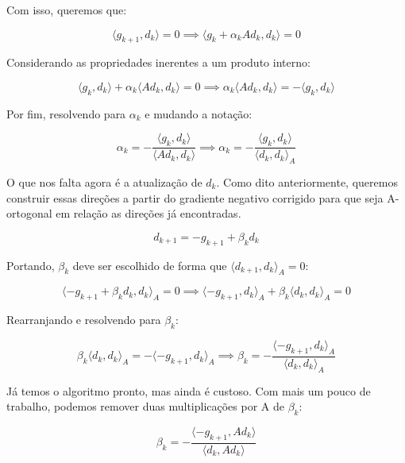 Com isso, queremos que:

\begin{equation}
\label{def_gc_dk_gk1}
\langle g_{k+1}, d_k \rangle = 0 \implies \langle g_k + \alpha_k A d_k, d_k \rangle = 0
\end{equation}


Considerando as propriedades inerentes a um produto interno:

\begin{equation}
\langle g_k, d_k \rangle + \alpha_k \langle A d_k, d_k \rangle = 0 \implies \alpha_k \langle A d_k, d_k \rangle = - \langle g_k, d_k \rangle
\end{equation}

Por fim, resolvendo para \(\alpha_k\) e mudando a notação:

\begin{equation}
\alpha_k= - \frac{\langle g_k, d_k \rangle}{\langle A d_k, d_k \rangle} \implies \alpha_k= - \frac{\langle g_k, d_k \rangle}{\langle d_k, d_k \rangle_A}
\end{equation}


O que nos falta agora é a atualização de \(d_k\). Como dito anteriormente, queremos
construir essas direções a partir do gradiente negativo corrigido para que seja
A-ortogonal em relação as direções já encontradas.

\begin{equation}
\label{def_dk1}
d_{k+1} = -g_{k+1} + \beta_k d_k
\end{equation}

Portando, \(\beta_k\) deve ser escolhido de forma que \(\langle d_{k+1}, d_k \rangle_A = 0\):

\begin{equation}
\langle -g_{k+1} + \beta_k d_k, d_k \rangle_A = 0 \implies \langle -g_{k+1}, d_k \rangle_A + \beta_k \langle d_k, d_k \rangle_A = 0
\end{equation}

Rearranjando e resolvendo para \( \beta_k \):

\begin{equation}
  \beta_k \langle d_k, d_k \rangle_A = - \langle -g_{k+1}, d_k \rangle_A \implies \beta_k = -\frac{\langle -g_{k+1}, d_k \rangle_A}{\langle d_k, d_k \rangle_A}
\end{equation}

Já temos o algoritmo pronto, mas ainda é custoso. Com mais um pouco de trabalho, podemos
remover duas multiplicações por A de \(\beta_k\):

\begin{equation}
\label{def_beta_gc}
\beta_k = - \frac{\langle -g_{k+1}, Ad_k \rangle}{\langle d_k, Ad_k \rangle}
\end{equation}

